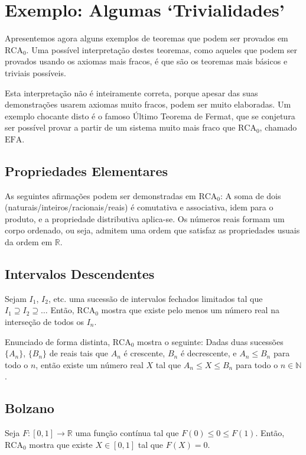 \section*{Exemplo: Algumas `Trivialidades'}

Apresentemos agora alguns exemplos de teoremas que podem ser provados em $\mathrm{RCA}_0$. Uma possível interpretação destes teoremas, como aqueles que podem ser provados usando os axiomas mais fracos, é que são os teoremas mais básicos e triviais possíveis.

Esta interpretação não é inteiramente correta, porque apesar das suas demonstrações usarem axiomas muito fracos, podem ser muito elaboradas. Um exemplo chocante disto é o famoso Último Teorema de Fermat, que se conjetura ser possível provar a partir de um sistema muito mais fraco que $\mathrm{RCA}_0$, chamado $\mathrm{EFA}$.

\subsection*{Propriedades Elementares}

As seguintes afirmações podem ser demonstradas em $\mathrm{RCA}_0$: A soma de dois (naturais/inteiros/racionais/reais) é comutativa e associativa, idem para o produto, e a propriedade distributiva aplica-se. Os números reais formam um corpo ordenado, ou seja, admitem uma ordem que satisfaz as propriedades usuais da ordem em $\mathbb{R}$.

\subsection*{Intervalos Descendentes}

Sejam $I_1$, $I_2$, etc. uma sucessão de intervalos fechados limitados tal que $I_1 \supseteq I_2 \supseteq \dots$ Então, $\mathrm{RCA}_0$ mostra que existe pelo menos um número real na interseção de todos os $I_n$.

Enunciado de forma distinta, $\mathrm{RCA}_0$ mostra o seguinte: Dadas duas sucessões $\{A_n\}$, $\{B_n\}$ de reais tais que $A_n$ é crescente, $B_n$ é decrescente, e $A_n \leq B_n$ para todo o $n$, então existe um número real $X$ tal que $A_n \leq X \leq B_n$ para todo o $n \in \mathbb{N}$.

\subsection*{Bolzano}

Seja $F \colon [0,1] \to \mathbb{R}$ uma função contínua tal que $F(0) \leq 0 \leq F(1)$. Então, $\mathrm{RCA}_0$ mostra que existe $X \in [0,1]$ tal que $F(X) = 0$.


